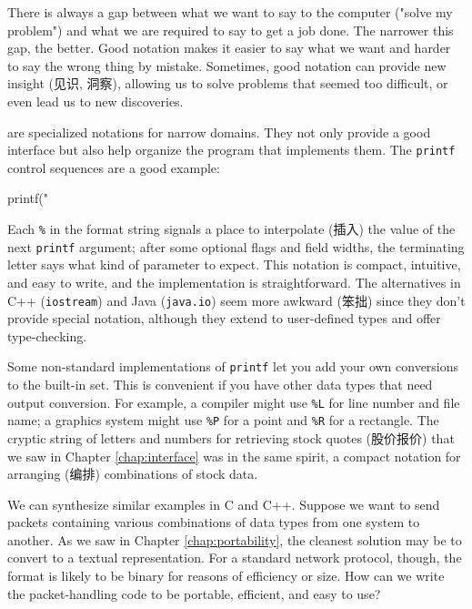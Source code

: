 There is always a gap between what we want to say to the computer ("solve
my problem") and what we are required to say to get a job done. The
narrower this gap, the better. Good notation makes it easier to say what we
want and harder to say the wrong thing by mistake. Sometimes, good notation
can provide new insight (见识, 洞察), allowing us to solve problems that
seemed too difficult, or even lead us to new discoveries.

 are specialized notations for narrow
domains. They not only provide a good interface but also help organize the
program that implements them. The \verb'printf' control sequences are a
good example:
\begin{wellcode}
    printf("%
\end{wellcode}

Each \verb'%' in the format string signals a place to interpolate (插入)
the value of the next \verb'printf' argument; after some optional flags and
field widths, the terminating letter says what kind of parameter to expect.
This notation is compact, intuitive, and easy to write, and the
implementation is straightforward. The alternatives in C++
(\verb'iostream') and Java (\verb'java.io') seem more awkward (笨拙) since
they don't provide special notation, although they extend to user-defined
types and offer type-checking.

Some non-standard implementations of \verb'printf' let you add your own
conversions to the built-in set. This is convenient if you have other data
types that need output conversion. For example, a compiler might use
\verb'%L' for line number and file name; a graphics system might use
\verb'%P' for a point and \verb'%R' for a rectangle. The cryptic string of
letters and numbers for retrieving stock quotes (股价报价) that we saw in
Chapter \ref{chap:interface} was in the same spirit, a compact notation for
arranging (编排) combinations of stock data.

We can synthesize similar examples in C and C++. Suppose we want to send
packets containing various combinations of data types from one system to
another.  As we saw in Chapter \ref{chap:portability}, the cleanest
solution may be to convert to a textual representation. For a standard
network protocol, though, the format is likely to be binary for reasons of
efficiency or size. How can we write the packet-handling code to be
portable, efficient, and easy to use?

